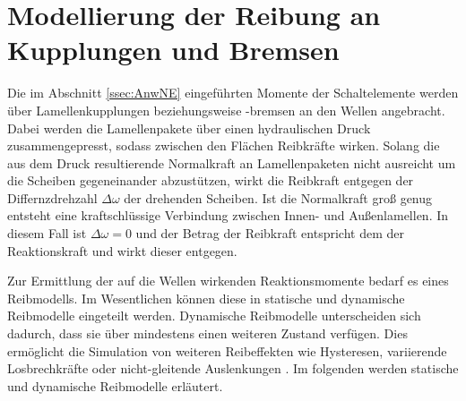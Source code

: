 \section{Modellierung der Reibung an Kupplungen und Bremsen} \label{sec:mod_reib}
Die im Abschnitt \ref{ssec:AnwNE} eingeführten Momente der Schaltelemente werden über Lamellenkupplungen beziehungsweise -bremsen an den Wellen angebracht. Dabei werden die Lamellenpakete über einen hydraulischen Druck zusammengepresst, sodass zwischen den Flächen Reibkräfte wirken. Solang die aus dem Druck resultierende Normalkraft an Lamellenpaketen nicht ausreicht um die Scheiben gegeneinander abzustützen, wirkt die Reibkraft entgegen der Differnzdrehzahl $\Delta \omega$ der drehenden Scheiben. Ist die Normalkraft groß genug entsteht eine kraftschlüssige Verbindung zwischen Innen- und Außenlamellen. In diesem Fall ist $\Delta \omega = 0$ und der Betrag der Reibkraft entspricht dem der Reaktionskraft und wirkt dieser entgegen.   

Zur Ermittlung der auf die Wellen wirkenden Reaktionsmomente bedarf es eines Reibmodells. Im Wesentlichen können diese in statische und dynamische Reibmodelle eingeteilt werden. Dynamische Reibmodelle unterscheiden sich dadurch, dass sie über mindestens einen weiteren Zustand verfügen. Dies ermöglicht die Simulation von weiteren Reibeffekten wie Hysteresen, variierende Losbrechkräfte oder nicht-gleitende Auslenkungen \cite{Schroeder.2015}. Im folgenden werden statische und dynamische Reibmodelle erläutert.


